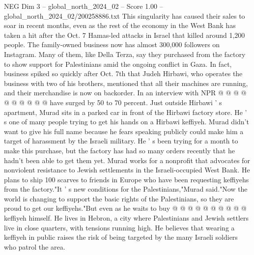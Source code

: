 \begin{textsample}{NEG Dim 3 – global\_north\_2024\_02 – Score 1.00 – global\_north\_2024\_02/200258886.txt}
This singularity has caused their sales to soar in recent months, even as the rest of the economy in the West Bank has taken a hit after the Oct. 7 Hamas-led attacks in Israel that killed around 1,200 people.
The family-owned business now has almost 300,000 followers on Instagram.
Many of them, like Della Terza, say they purchased from the factory to show support for Palestinians amid the ongoing conflict in Gaza.
In fact, business spiked so quickly after Oct. 7th that Judeh Hirbawi, who operates the business with two of his brothers, mentioned that all their machines are running, and their merchandise is now on backorder.
In an interview with NPR @ @ @ @ @ @ @ @ @ @ have surged by 50 to 70 percent.
Just outside Hirbawi ' s apartment, Murad sits in a parked car in front of the Hirbawi factory store.
He ' s one of many people trying to get his hands on a Hirbawi keffiyeh.
Murad didn't want to give his full name because he fears speaking publicly could make him a target of harassment by the Israeli military.
He ' s been trying for a month to make this purchase, but the factory has had so many orders recently that he hadn't been able to get them yet.
Murad works for a nonprofit that advocates for nonviolent resistance to Jewish settlements in the Israeli-occupied West Bank.
He plans to ship 100 scarves to friends in Europe who have been requesting keffiyehs from the factory."It ' s new conditions for the Palestinians,"Murad said."Now the world is changing to support the basic rights of the Palestinians, so they are proud to get our keffiyehs."But even as he waits to buy @ @ @ @ @ @ @ @ @ @ keffiyeh himself.
He lives in Hebron, a city where Palestinians and Jewish settlers live in close quarters, with tensions running high.
He believes that wearing a keffiyeh in public raises the risk of being targeted by the many Israeli soldiers who patrol the area.

\end{textsample}
